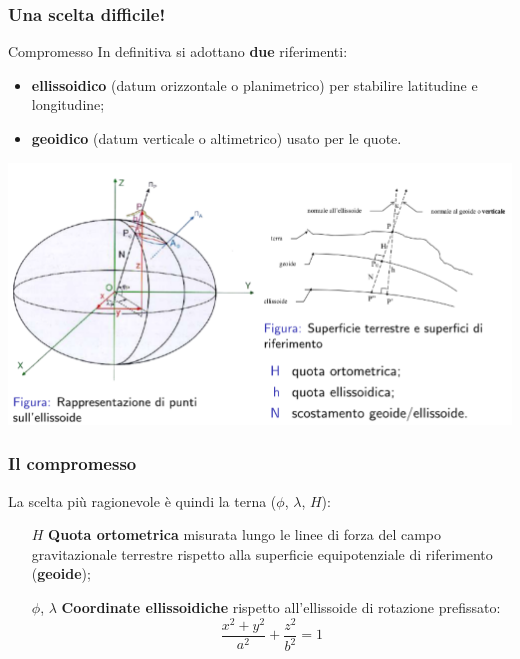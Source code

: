 \documentclass{beamer}
\begin{document}
{\begin{frame}
\begin{columns}
    \end{columns}

\end{frame}

\begin{frame}
    \frametitle{Una scelta difficile!}

    \begin{block}{Compromesso}
    In definitiva si adottano \textbf{due} riferimenti:
    \begin{itemize}
        \item \textbf{ellissoidico} (datum orizzontale o planimetrico) per stabilire
            latitudine e longitudine;
        \item \textbf{geoidico} (datum verticale o altimetrico) usato per le quote.
    \end{itemize}    
    \end{block}
    \begin{center}
        \includegraphics[height=.5\textheight]{./pics_2022_03/rifsups.png}	
    \end{center} 

\end{frame}

\begin{frame}
    \frametitle{Il compromesso}
    
    La scelta più ragionevole è quindi la terna ($\phi$, $\lambda$, $H$):
    {\small \begin{itemize}
        \item [$H$] \textbf{Quota ortometrica} misurata lungo le linee di forza 
            del campo gravitazionale terrestre rispetto alla superficie equipotenziale
            di riferimento (\textbf{geoide});
        \item[$\phi$, $\lambda$] \textbf{Coordinate ellissoidiche} rispetto all'ellissoide
            di rotazione prefissato:
            $$
            \frac{x^2+y^2}{a^2} + \frac{z^2}{b^2} = 1
            $$
    \end{itemize}}
    

\end{frame}}
\end{document}
